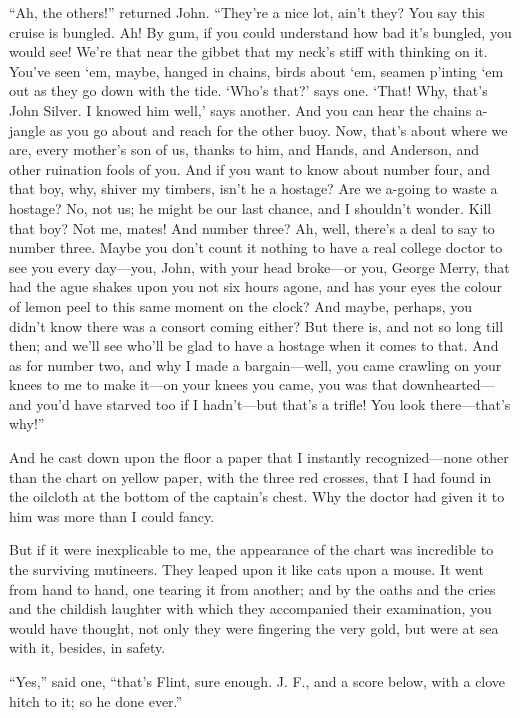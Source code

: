 \enquote{Ah, the others!} returned John. \enquote{They’re a nice lot, ain’t they? You say this cruise is bungled. Ah! By gum, if you could understand how bad it’s bungled, you would see! We’re that near the gibbet that my neck’s stiff with thinking on it. You’ve seen `em, maybe, hanged in chains, birds about `em, seamen p’inting `em out as they go down with the tide. ‘Who’s that?’ says one. ‘That! Why, that’s John Silver. I knowed him well,’ says another. And you can hear the chains a-jangle as you go about and reach for the other buoy. Now, that’s about where we are, every mother’s son of us, thanks to him, and Hands, and Anderson, and other ruination fools of you. And if you want to know about number four, and that boy, why, shiver my timbers, isn’t he a hostage? Are we a-going to waste a hostage? No, not us; he might be our last chance, and I shouldn’t wonder. Kill that boy? Not me, mates! And number three? Ah, well, there’s a deal to say to number three. Maybe you don’t count it nothing to have a real college doctor to see you every day---you, John, with your head broke---or you, George Merry, that had the ague shakes upon you not six hours agone, and has your eyes the colour of lemon peel to this same moment on the clock? And maybe, perhaps, you didn’t know there was a consort coming either? But there is, and not so long till then; and we’ll see who’ll be glad to have a hostage when it comes to that. And as for number two, and why I made a bargain---well, you came crawling on your knees to me to make it---on your knees you came, you was that downhearted---and you’d have starved too if I hadn’t---but that’s a trifle! You look there---that’s why!}

And he cast down upon the floor a paper that I instantly recognized---none other than the chart on yellow paper, with the three red crosses, that I had found in the oilcloth at the bottom of the captain’s chest. Why the doctor had given it to him was more than I could fancy.

But if it were inexplicable to me, the appearance of the chart was incredible to the surviving mutineers. They leaped upon it like cats upon a mouse. It went from hand to hand, one tearing it from another; and by the oaths and the cries and the childish laughter with which they accompanied their examination, you would have thought, not only they were fingering the very gold, but were at sea with it, besides, in safety.

\enquote{Yes,} said one, \enquote{that’s Flint, sure enough. J. F., and a score below, with a clove hitch to it; so he done ever.}

